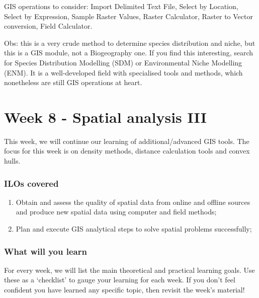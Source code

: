 \documentclass[
  letterpaper,
  DIV=11,
  numbers=noendperiod]{scrreprt}
\begin{document}
GIS operations to consider: Import Delimited Text File, Select by
Location, Select by Expression, Sample Raster Values, Raster Calculator,
Raster to Vector conversion, Field Calculator.

Obs: this is a very crude method to determine species distribution and
niche, but this is a GIS module, not a Biogeography one. If you find
this interesting, search for Species Distribution Modelling (SDM) or
Environmental Niche Modelling (ENM). It is a well-developed field with
specialised tools and methods, which nonetheless are still GIS
operations at heart.

\part{Week 8 - Spatial analysis III}

This week, we will continue our learning of additional/advanced GIS
tools. The focus for this week is on density methods, distance
calculation tools and convex hulls.

\section*{ILOs covered}\label{ilos-covered-6}


\begin{enumerate}
\def\labelenumi{\arabic{enumi}.}
\setcounter{enumi}{1}
\item
  Obtain and assess the quality of spatial data from online and offline
  sources and produce new spatial data using computer and field methods;
\item
  Plan and execute GIS analytical steps to solve spatial problems
  successfully;
\end{enumerate}

\section*{What will you learn}\label{what-will-you-learn-6}


For every week, we will list the main theoretical and practical learning
goals. Use these as a `checklist' to gauge your learning for each week.
If you don't feel confident you have learned any specific topic, then
revisit the week's material!
\end{document}
